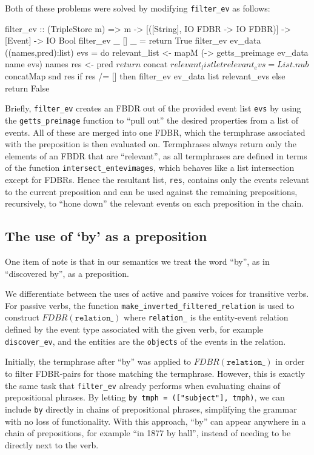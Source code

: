 \documentclass[../main.tex]{subfiles}
\begin{document}
Both of these problems were solved by modifying \texttt{filter\_ev} as follows:

\begin{code}
	filter_ev :: (TripleStore m) => m -> [([String], IO FDBR -> IO FDBR)] -> [Event] -> IO Bool
	filter_ev _ [] _ = return True
	filter_ev ev_data ((names,pred):list) evs = do
		relevant_list <- mapM (\name -> getts_preimage ev_data name evs) names
		res <- pred $ return $ concat $ relevant_list
		let relevant_evs = List.nub $ concatMap snd res
		if res /= [] then filter_ev ev_data list relevant_evs else return False
\end{code}

Briefly, \texttt{filter\_ev} creates an FBDR out of the provided event list \texttt{evs} by using the \texttt{getts\_preimage} function
to ``pull out'' the desired properties from a list of events.  All of these are merged into one FDBR,
which the termphrase associated with the preposition is then evaluated on.  Termphrases always return only the elements of an FBDR that are ``relevant'',
as all termphrases are defined in terms of the function \texttt{intersect\_entevimages}, which behaves like a list intersection except for FDBRs.
Hence the resultant list, \texttt{res}, contains only the events relevant to the current preposition and can be used against the remaining prepositions, recursively, to ``hone down'' the relevant events on each preposition in the chain.

\subsection{The use of `by' as a preposition}

One item of note is that in our semantics we treat the word ``by'', as in ``discovered by'', as a preposition.

We differentiate between the uses of active and passive voices for transitive verbs.  For passive verbs, the function
\texttt{make\_inverted\_filtered\_relation} is used to construct $FDBR(\texttt{relation\_})$ where \texttt{relation\_} is
the entity-event relation defined by the event type associated with the given verb, for example \texttt{discover\_ev}, and the
entities are the \texttt{objects} of the events in the relation.

Initially, the termphrase after ``by'' was applied to $FDBR(\texttt{relation\_})$ in order to filter FDBR-pairs for those matching
the termphrase.  However, this is exactly the same task that \texttt{filter\_ev} already performs when evaluating chains of prepositional phrases.
By letting \texttt{by tmph = (["subject"], tmph)}, we can include \texttt{by} directly in chains of prepositional phrases, simplifying the grammar
with no loss of functionality.  With this approach, ``by'' can appear anywhere in a chain of prepositions, for example ``in 1877 by hall'', instead
of needing to be directly next to the verb.
\end{document}
